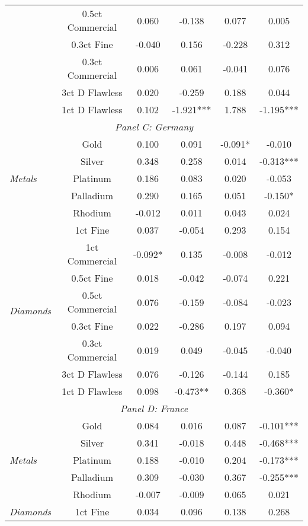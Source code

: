 \begin{tabularx}{1\textwidth}{Xccccc}
								& 0.5ct Commercial & 0.060 & -0.138 & 0.077 & 0.005 \\
								& 0.3ct Fine & -0.040 & 0.156 & -0.228 & 0.312 \\
								& 0.3ct Commercial & 0.006 & 0.061 & -0.041 & 0.076 \\
								& 3ct D Flawless & 0.020 & -0.259 & 0.188 & 0.044 \\
								& 1ct D Flawless & 0.102 & -1.921*** & 1.788 & -1.195*** \\
\midrule
\multicolumn{6}{c}{\emph{Panel C: Germany}} \\
\multirow{5}{*}{\emph{Metals}} & Gold & 0.100 & 0.091 & -0.091* & -0.010 \\
								& Silver & 0.348 & 0.258 & 0.014 & -0.313*** \\
								& Platinum & 0.186 & 0.083 & 0.020 & -0.053 \\
								& Palladium & 0.290 & 0.165 & 0.051 & -0.150* \\
								& Rhodium & -0.012 & 0.011 & 0.043 & 0.024 \\
\midrule
\multirow{8}{*}{\emph{Diamonds}} & 1ct Fine & 0.037 & -0.054 & 0.293 & 0.154 \\
								& 1ct Commercial & -0.092* & 0.135 & -0.008 & -0.012 \\
								& 0.5ct Fine & 0.018 & -0.042 & -0.074 & 0.221 \\
								& 0.5ct Commercial & 0.076 & -0.159 & -0.084 & -0.023 \\
								& 0.3ct Fine & 0.022 & -0.286 & 0.197 & 0.094 \\
								& 0.3ct Commercial & 0.019 & 0.049 & -0.045 & -0.040 \\
								& 3ct D Flawless & 0.076 & -0.126 & -0.144 & 0.185 \\
								& 1ct D Flawless & 0.098 & -0.473** & 0.368 & -0.360* \\
\midrule
\multicolumn{6}{c}{\emph{Panel D: France}} \\
\multirow{5}{*}{\emph{Metals}}  & Gold & 0.084 & 0.016 & 0.087 & -0.101*** \\
								& Silver & 0.341 & -0.018 & 0.448 & -0.468*** \\
								& Platinum & 0.188 & -0.010 & 0.204 & -0.173*** \\
								& Palladium & 0.309 & -0.030 & 0.367 & -0.255*** \\
								& Rhodium & -0.007 & -0.009 & 0.065 & 0.021 \\
\midrule
\multirow{8}{*}{\emph{Diamonds}} & 1ct Fine & 0.034 & 0.096 & 0.138 & 0.268 \\

\end{tabularx}
